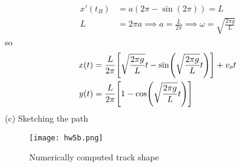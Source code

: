 \documentclass[../hw.tex]{subfiles}
\begin{document}
\begin{align*}
    x'(t_B) &= a(2\pi - \sin(2\pi)) = L \\
    L &= 2\pi a \implies a = \frac{L}{2\pi} \implies \omega = \sqrt{\frac{2\pi g}{L}}
\end{align*}
so 
\begin{align*}
    x(t) &= \frac{L}{2\pi} \qt[\sqrt{\frac{2\pi g}{L}} t - \sin(\sqrt{\frac{2\pi g}{L}} t)] 
    + v_o t \\
    y(t) &= \frac{L}{2\pi} \qt[1 - \cos(\sqrt{\frac{2\pi g}{L}} t)]
\end{align*}
\newpage
(c) Sketching the path
\begin{figure}[ht]
    \centering
    \texttt{[image: hw5b.png]}
    \caption{Numerically computed track shape}
\end{figure}
\end{document}
